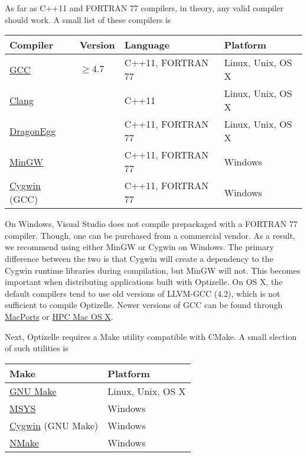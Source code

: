 \documentclass{report}
\begin{document}
        As far as C++11 and FORTRAN 77 compilers, in theory, any valid compiler should work.  A small list of these compilers is
\label{tbl:compilers}
\begin{center}\begin{tabular}{|l|l|l|l|}\hline
{\bf Compiler} & {\bf Version} & {\bf Language} & {\bf Platform}\\\hline
\href{http://gcc.gnu.org}{GCC} & $\geq 4.7$ & C++11, FORTRAN 77 & Linux, Unix, OS X \\\hline
\href{http://clang.llvm.org}{Clang} & & C++11 & Linux, Unix, OS X \\\hline
\href{http://dragonegg.llvm.org}{DragonEgg} & & C++11, FORTRAN 77 & Linux, Unix, OS X \\\hline
\href{http://www.mingw.org}{MinGW} & & C++11, FORTRAN 77 & Windows \\\hline
\href{http://www.cygwin.com}{Cygwin} (GCC) & & C++11, FORTRAN 77 & Windows \\\hline
\end{tabular}\end{center}
On Windows, Visual Studio does not compile prepackaged with a FORTRAN 77 compiler.  Though, one can be purchased from a commercial vendor.  As a result, we recommend using either MinGW or Cygwin on Windows.  The primary difference between the two is that Cygwin will create a dependency to the Cygwin runtime libraries during compilation, but MinGW will not.  This becomes important when distributing applications built with Optizelle.  On OS X, the default compilers tend to use old versions of LLVM-GCC (4.2), which is not sufficient to compile Optizelle.  Newer versions of GCC can be found through \href{https://www.macports.org}{MacPorts} or \href{http://hpc.sourceforge.net}{HPC Mac OS X}.

       Next, Optizelle requires a Make utility compatible with CMake.  A small slection of such utilities is 
\label{tbl:make}
\begin{center}\begin{tabular}{|l|l|}\hline
{\bf Make} & {\bf Platform}\\\hline
\href{https://www.gnu.org/software/make}{GNU Make} & Linux, Unix, OS X \\\hline
\href{http://www.mingw.org}{MSYS} & Windows\\\hline
\href{http://www.cygwin.com}{Cygwin} (GNU Make) & Windows \\\hline
\href{http://msdn.microsoft.com/en-us/vstudio}{NMake} & Windows \\\hline
\end{tabular}\end{center}
\end{document}
